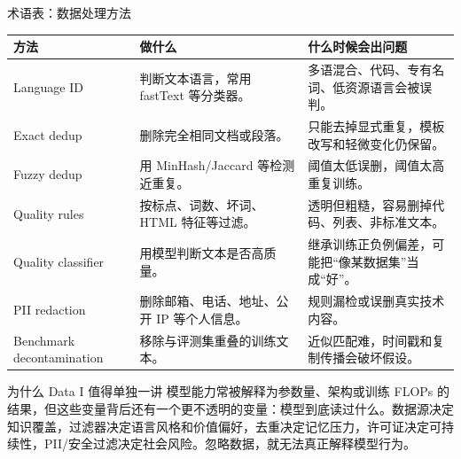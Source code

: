 \begin{knowledgebox}{术语表：数据处理方法}
\begin{longtable}{L{0.22\textwidth}L{0.34\textwidth}L{0.34\textwidth}}
\toprule
方法 & 做什么 & 什么时候会出问题 \\
\midrule
\endhead
Language ID & 判断文本语言，常用 fastText 等分类器。 & 多语混合、代码、专有名词、低资源语言会被误判。 \\
Exact dedup & 删除完全相同文档或段落。 & 只能去掉显式重复，模板改写和轻微变化仍保留。 \\
Fuzzy dedup & 用 MinHash/Jaccard 等检测近重复。 & 阈值太低误删，阈值太高重复训练。 \\
Quality rules & 按标点、词数、坏词、HTML 特征等过滤。 & 透明但粗糙，容易删掉代码、列表、非标准文本。 \\
Quality classifier & 用模型判断文本是否高质量。 & 继承训练正负例偏差，可能把“像某数据集”当成“好”。 \\
PII redaction & 删除邮箱、电话、地址、公开 IP 等个人信息。 & 规则漏检或误删真实技术内容。 \\
Benchmark decontamination & 移除与评测集重叠的训练文本。 & 近似匹配难，时间戳和复制传播会破坏假设。 \\
\bottomrule
\end{longtable}
\end{knowledgebox}

\begin{importantbox}{为什么 Data I 值得单独一讲}
模型能力常被解释为参数量、架构或训练 FLOPs 的结果，但这些变量背后还有一个更不透明的变量：模型到底读过什么。数据源决定知识覆盖，过滤器决定语言风格和价值偏好，去重决定记忆压力，许可证决定可持续性，PII/安全过滤决定社会风险。忽略数据，就无法真正解释模型行为。
\end{importantbox}

